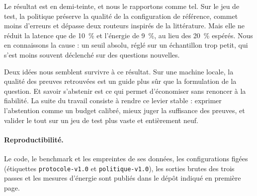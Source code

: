 \documentclass[11pt,a4paper]{article}
\begin{document}
Le résultat est en demi-teinte, et nous le rapportons comme tel. Sur le jeu de test, la politique
préserve la qualité de la configuration de référence, commet moins d'erreurs et dépasse deux routeurs
inspirés de la littérature. Mais elle ne réduit la latence que de 10~\% et l'énergie de 9~\%, au lieu
des 20~\% espérés. Nous en connaissons la cause : un seuil absolu, réglé sur un échantillon trop petit,
qui s'est moins souvent déclenché sur des questions nouvelles.

Deux idées nous semblent survivre à ce résultat. Sur une machine locale, la qualité des preuves
retrouvées est un guide plus sûr que la formulation de la question. Et savoir s'abstenir est ce qui
permet d'économiser sans renoncer à la fiabilité. La suite du travail consiste à rendre ce levier
stable : exprimer l'abstention comme un budget calibré, mieux juger la suffisance des preuves, et
valider le tout sur un jeu de test plus vaste et entièrement neuf.

\paragraph{Reproductibilité.} Le code, le benchmark et les empreintes de ses données, les configurations
figées (étiquettes \texttt{protocole-v1.0} et \texttt{politique-v1.0}), les sorties brutes des trois
passes et les mesures d'énergie sont publiés dans le dépôt indiqué en première page.



\end{document}
